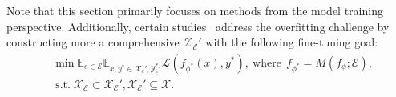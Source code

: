 \documentclass[acmsmall, screen]{acmart}
\def \st{\;\text{s.t.}\;}
\begin{document}
{Note that this section primarily focuses on methods from the model training perspective. Additionally, certain studies~\cite{jiang2024learning, gangadhar2024modeleditingstandardfinetuning} address the overfitting challenge by constructing more a comprehensive $\mathcal{X_{E}'}$ with the following fine-tuning goal:}
\begin{equation}
    \begin{aligned}
            & \min \mathbb{E}_{e \in \mathcal{E}} \mathbb{E}_{x, y^{*} \in \mathcal{X}_{e}', {\mathcal{Y}^*_e}' } \mathcal{L} (f_{\phi^*}(x), y^{*}),\ \text{where}\ \  f_{\phi^*}=M(f_\phi; \mathcal{E}),\\
        &\st \mathcal{X_E}\subset \mathcal{X_{E}}',  \mathcal{X_{E}}'\subseteq\mathcal{X}.
    \end{aligned}
    \label{eq:finetune}
    \end{equation}



\end{document}
